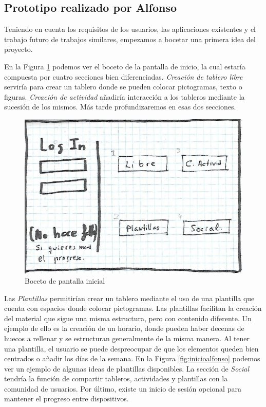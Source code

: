 \subsection{Prototipo realizado por Alfonso}
\label{cap4:sec:alfonso}
Teniendo en cuenta los requisitos de los usuarios, las aplicaciones existentes y el trabajo futuro de trabajos similares, empezamos a bocetar una primera idea del proyecto.


En la Figura \ref{fig:loginalfonso} podemos ver el boceto de la pantalla de  inicio, la cual estaría compuesta por cuatro secciones bien diferenciadas. \textit{Creación de tablero libre} serviría para crear un tablero donde se pueden colocar pictogramas, texto o figuras. \textit{Creación de actividad} añadiría interacción a los tableros mediante la sucesión de los mismos. Más tarde profundizaremos en esas dos secciones.

\begin{figure}[h!]
	\centering
	\includegraphics[width=0.7\linewidth]{Imagenes/Bitmap/logInAlfonso}
	\caption{Boceto de pantalla inicial}
	\label{fig:loginalfonso}
\end{figure}

Las \textit{Plantillas} permitirían crear un tablero mediante el uso de una plantilla que cuenta con espacios donde colocar pictogramas. Las plantillas facilitan la creación del material que sigue una misma estructura, pero con contenido diferente. Un ejemplo de ello es la creación de un horario, donde pueden haber decenas de huecos a rellenar y se estructuran generalmente de la misma manera. Al tener una plantilla, el usuario se puede despreocupar de que los elementos queden bien centrados o añadir los días de la semana. En la Figura \ref{fig:inicioalfonso} podemos ver un ejemplo de algunas ideas de plantillas disponibles. 
La sección de \textit{Social} tendría la función de compartir tableros, actividades y plantillas con la comunidad de usuarios. Por último, existe un inicio de sesión opcional para mantener el progreso entre dispositivos.


